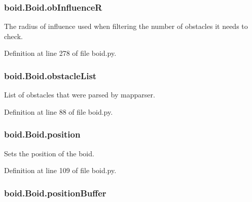 \hypertarget{classboid_1_1Boid_abc5327f9ad46170e5f57d89c2c6e18e9}{
\subsubsection[{ob\-Influence\-R}]{\setlength{\rightskip}{0pt plus 5cm}boid.\-Boid.\-ob\-Influence\-R}}\label{classboid_1_1Boid_abc5327f9ad46170e5f57d89c2c6e18e9}


The radius of influence used when filtering the number of obstacles it needs to check. 



Definition at line 278 of file boid.\-py.

\hypertarget{classboid_1_1Boid_a9db9b88d02af40d3773b034560959694}{
\subsubsection[{obstacle\-List}]{\setlength{\rightskip}{0pt plus 5cm}boid.\-Boid.\-obstacle\-List}}\label{classboid_1_1Boid_a9db9b88d02af40d3773b034560959694}


List of obstacles that were parsed by mapparser. 



Definition at line 88 of file boid.\-py.

\hypertarget{classboid_1_1Boid_a483cb30093bc500a6123d5a801247ad5}{
\subsubsection[{position}]{\setlength{\rightskip}{0pt plus 5cm}boid.\-Boid.\-position}}\label{classboid_1_1Boid_a483cb30093bc500a6123d5a801247ad5}


Sets the position of the boid. 



Definition at line 109 of file boid.\-py.

\hypertarget{classboid_1_1Boid_ab6c778a50dd384fabc6aa48be04c0988}{
\subsubsection[{position\-Buffer}]{\setlength{\rightskip}{0pt plus 5cm}boid.\-Boid.\-position\-Buffer}}\label{classboid_1_1Boid_ab6c778a50dd384fabc6aa48be04c0988}


